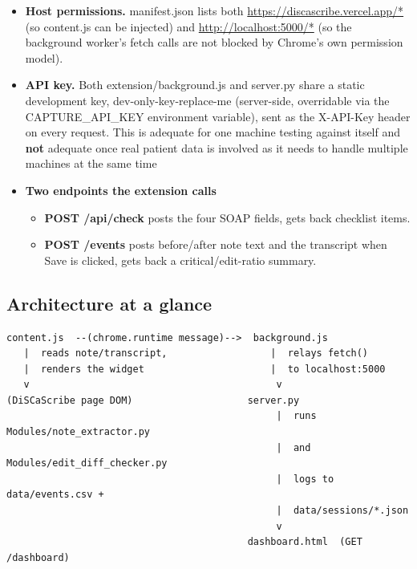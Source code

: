 \documentclass[11pt,a4paper]{article}
\begin{document}
\begin{itemize}
  \item \textbf{Host permissions.} manifest.json lists both
  \url{https://discascribe.vercel.app/*} (so content.js can be
  injected) and \url{http://localhost:5000/*} (so the background worker's
  fetch calls are not blocked by Chrome's own permission model).
  
  \item \textbf{API key.} Both extension/background.js and
  server.py share a static development key,
 dev-only-key-replace-me (server-side, overridable via the
  CAPTURE\_API\_KEY environment variable), sent as the
  X-API-Key header on every request. This is adequate for one machine
  testing against itself and \textbf{not} adequate once real patient data is
  involved as it needs to handle multiple machines at the same time
  
  \item \textbf{Two endpoints the extension calls}
  \begin{itemize}
    \item \textbf{POST /api/check} posts the four SOAP fields, gets back
    checklist items.
    \item \textbf{POST /events} posts before/after note text and the
    transcript when Save is clicked, gets back a critical/edit-ratio
    summary.
  \end{itemize}
\end{itemize}

\subsection{Architecture at a glance}

\begin{verbatim}
content.js  --(chrome.runtime message)-->  background.js
   |  reads note/transcript,                  |  relays fetch()
   |  renders the widget                      |  to localhost:5000
   v                                           v
(DiSCaScribe page DOM)                    server.py
                                               |  runs Modules/note_extractor.py
                                               |  and Modules/edit_diff_checker.py
                                               |  logs to data/events.csv +
                                               |  data/sessions/*.json
                                               v
                                          dashboard.html  (GET /dashboard)
\end{verbatim}
\end{document}
